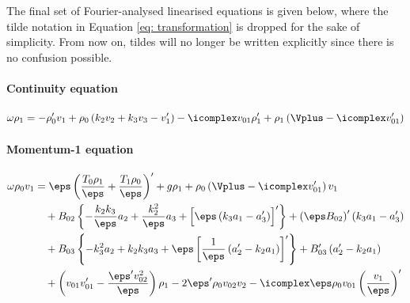 The final set of Fourier-analysed linearised equations is given below, where the tilde notation in Equation \eqref{eq: transformation} is dropped for the sake of simplicity. From now on, tildes will no longer be written explicitly since there is no confusion possible.

\paragraph{Continuity equation}
{\customEquationFont
\begin{equation} \label{eq: full_continuity}
  \omega\rho_1 =
    -\rho_0' v_1 + \rho_0\left(k_2 v_2 + k_3 v_3 - v_1'\right)
    -\icomplex v_{01}\rho_1' + \rho_1 \left(\Vplus - \icomplex v_{01}'\right)
\end{equation}
}%

\paragraph{Momentum-1 equation}
{\customEquationFont
\begin{equation} \label{eq: full_momentum1}
  \begin{aligned}
  \omega\rho_0 v_1 &=
    \eps\left(\frac{T_0 \rho_1}{\eps} + \frac{T_1 \rho_0}{\eps}\right)'
    + g \rho_1
    + \rho_0 \left(\Vplus - \icomplex v_{01}'\right)v_1 \\
    &\quad
		+ B_{02} \left\{
      - \frac{k_2 k_3}{\eps}a_2 + \frac{k_2^2}{\eps}a_3 + \Bigl[\eps\left(k_3a_1 - a_3'\right)\Bigr]'
    \right\}
    + \left(\eps B_{02}\right)'\left(k_3a_1 - a_3'\right)  \\
    &\quad
    + B_{03} \left\{
      -k_3^2 a_2 + k_2 k_3a_3 + \eps\left[\frac{1}{\eps}\left(a_2' - k_2 a_1 \right)\right]'
    \right\}
    + B_{03}' \left(a_2' - k_2a_1\right) \\
    &\quad
    + \left(v_{01} v_{01}' - \frac{\eps' v_{02}^2}{\eps}\right)\rho_1
		- 2 \eps' \rho_0 v_{02} v_2
    - \icomplex \eps\rho_0 v_{01} \left(\frac{v_1}{\eps}\right)'
  \end{aligned}
\end{equation}
}%

